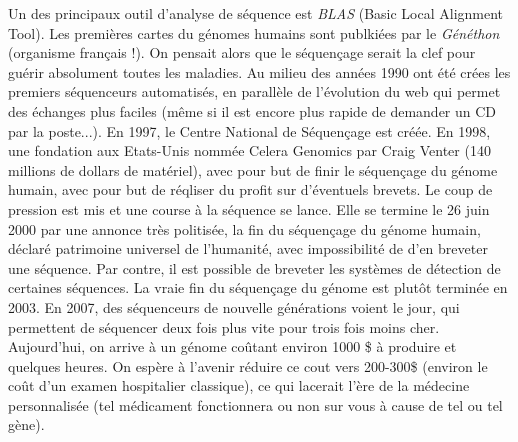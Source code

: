 \documentclass{article}
\begin{document}
Un des principaux outil d'analyse de séquence est \emph{BLAS} (Basic Local Alignment Tool). Les premières cartes du génomes humains sont publkiées par le \emph{Généthon} (organisme français !). On pensait alors que le séquençage serait la clef pour guérir absolument toutes les maladies. Au milieu des années 1990 ont été crées les premiers séquenceurs automatisés, en parallèle de l'évolution du web qui permet des échanges plus faciles (même si il est encore plus rapide de demander un CD par la poste...). En 1997, le Centre National de Séquençage est créée. En 1998, une fondation aux Etats-Unis nommée Celera Genomics par Craig Venter (140 millions de dollars de matériel), avec pour but de finir le séquençage du génome humain, avec pour but de réqliser du profit sur d'éventuels brevets. Le coup de pression est mis et une course à la séquence se lance. Elle se termine le 26 juin 2000 par une annonce très politisée, la fin du séquençage du génome humain, déclaré patrimoine universel de l'humanité, avec impossibilité de d'en breveter une séquence. Par contre, il est possible de breveter les systèmes de détection de certaines séquences. La vraie fin du séquençage du génome est plutôt terminée en 2003. En 2007, des séquenceurs de nouvelle générations voient le jour, qui permettent de séquencer deux fois plus vite pour trois fois moins cher. Aujourd'hui, on arrive à un génome coûtant environ 1000 \$ à produire et quelques heures. On espère à l'avenir réduire ce cout vers 200-300\$ (environ le coût d'un examen hospitalier classique), ce qui lacerait l'ère de la médecine personnalisée (tel médicament fonctionnera ou non sur vous à cause de tel ou tel gène).
\end{document}
